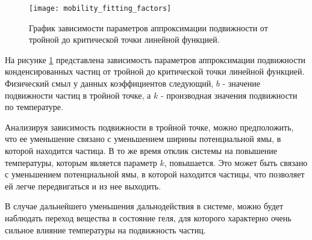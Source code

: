\begin{figure}[h]
\begin{center}
\texttt{[image: mobility\_fitting\_factors]}
\caption{График зависимости параметров аппроксимации подвижности от тройной до критической точки линейной функцией.}
\label{risDmu}
\end{center}
\end{figure}

На рисунке \ref{risDmu} представлена зависимость параметров аппроксимации подвижности конденсированных частиц от тройной до критической точки линейной функцией. Физический смыл у данных коэффициентов следующий, $b$ - значение подвижности частиц в тройной точке, а $k$ - производная значения подвижности по температуре. 

Анализируя зависимость подвижности в тройной точке, можно предположить, что ее уменьшение связано с уменьшением ширины потенциальной ямы, в которой находится частица. В то же время отклик системы на повышение температуры, которым является параметр $k$, повышается. Это может быть связано с уменьшением потенциальной ямы, в которой находится частицы, что позволяет ей легче передвигаться и из нее выходить.

В случае дальнейшего уменьшения дальнодействия в системе, можно будет наблюдать переход вещества в состояние геля, для которого характерно очень сильное влияние температуры на подвижность частиц.





